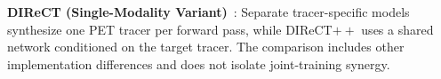 \item \textbf{DIReCT (Single-Modality Variant)}~\cite{liu2025direct}: Separate tracer-specific models synthesize one PET tracer per forward pass, while DIReCT$++$ uses a shared network conditioned on the target tracer. The comparison includes other implementation differences and does not isolate joint-training synergy.
